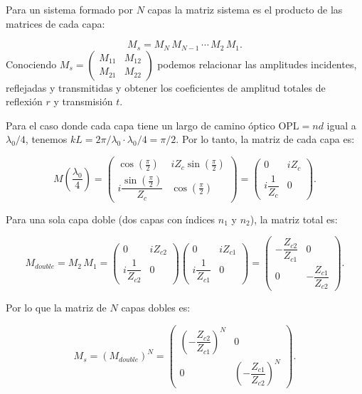 \documentclass[11pt]{article}
\begin{document}
Para un sistema formado por \(N\) capas la matriz sistema es el producto de las matrices de cada capa:

\[
M_s = M_N \, M_{N-1}\, \cdots \, M_2 \, M_1.
\tag{2}
\]
Conociendo \(M_s = \begin{pmatrix} M_{11} & M_{12} \\ M_{21} & M_{22}\end{pmatrix}\) podemos relacionar las amplitudes incidentes, reflejadas y transmitidas y obtener los coeficientes de amplitud totales de reflexión \(r\) y transmisión \(t\).

Para el caso donde cada capa tiene un largo de camino óptico \(\mathrm{OPL} = n d\) igual a \(\lambda_0/4\), tenemos \(kL = 2\pi/\lambda_0 \cdot \lambda_0/4 = \pi/2\). Por lo tanto, la matriz de cada capa es:

\[
M\left(\frac{\lambda_0}{4}\right) =
\begin{pmatrix}
\cos\left(\frac{\pi}{2}\right) & i Z_c \sin\left(\frac{\pi}{2}\right) \\[6pt]
i \dfrac{\sin\left(\frac{\pi}{2}\right)}{Z_c} & \cos\left(\frac{\pi}{2}\right)
\end{pmatrix} =
\begin{pmatrix}
0 & i Z_c \\[6pt]
i \dfrac{1}{Z_c} & 0
\end{pmatrix}.
\]

Para una sola capa doble (dos capas con índices \(n_1\) y \(n_2\)), la matriz total es:

\[
M_{double} = M_2 \, M_1 =
\begin{pmatrix}
0 & i Z_{c2} \\[6pt]
i \dfrac{1}{Z_{c2}} & 0
\end{pmatrix}
\begin{pmatrix}
0 & i Z_{c1} \\[6pt]
i \dfrac{1}{Z_{c1}} & 0
\end{pmatrix} =
\begin{pmatrix}
- \dfrac{Z_{c2}}{Z_{c1}} & 0 \\[6pt]
0 & - \dfrac{Z_{c1}}{Z_{c2}}
\end{pmatrix}.
\]

Por lo que la matriz de \(N\) capas dobles es:

\[
M_s = (M_{double})^N =
\begin{pmatrix}
\left(- \dfrac{Z_{c2}}{Z_{c1}}\right)^N & 0 \\[6pt]
0 & \left(- \dfrac{Z_{c1}}{Z_{c2}}\right)^N
\end{pmatrix}.
\]
\end{document}
